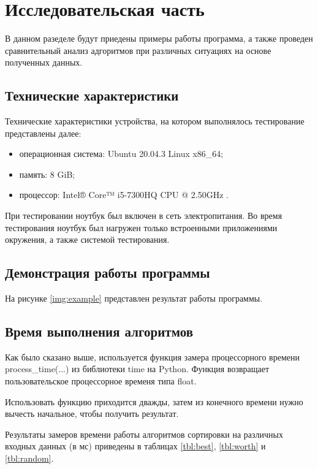 \chapter{Исследовательская часть}

В данном разеделе будут приедены примеры работы программа, а также проведен сравнительный анализ адгоритмов при различных ситуациях на основе полученных данных.

\section{Технические характеристики}

Технические характеристики устройства, на котором выполнялось тестирование представлены далее:

\begin{itemize}
    \item операционная система: Ubuntu 20.04.3 \cite{ubuntu} Linux \cite{linux} x86\_64;
    \item память: 8 GiB;
    \item процессор: Intel® Core™ i5-7300HQ CPU @ 2.50GHz \cite{intel}.
\end{itemize}

При тестировании ноутбук был включен в сеть электропитания. Во время тестирования ноутбук был нагружен только встроенными приложениями окружения, а также системой тестирования.

\section{Демонстрация работы программы}

На рисунке \ref{img:example} представлен результат работы программы.

\clearpage

\section{Время выполнения алгоритмов}

Как было сказано выше, используется функция замера процессорного времени process\_time(...) из библиотеки time на Python. Функция возвращает пользовательское процессорное временя типа float.

Использовать функцию приходится дважды, затем из конечного времени нужно вычесть начальное, чтобы получить результат.

Результаты замеров времени работы алгоритмов сортировки на различных входных данных (в мс) приведены в таблицах \ref{tbl:best}, \ref{tbl:worth} и \ref{tbl:random}.


